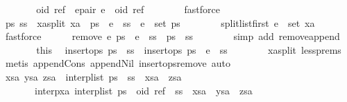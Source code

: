 \begin{isabellebody}
\ \ \ \ \isamarkupfalse%
\ \isamarkupfalse%
\ oid\ ref\ \ e{\isacharunderscore}pair{\isacharcolon}\ {\isachardoublequoteopen}e\ {\isacharequal}\ {\isacharparenleft}oid{\isacharcomma}\ ref{\isacharparenright}{\isachardoublequoteclose}\isanewline
\ \ \ \ \ \ \isamarkupfalse%
\ fastforce\isanewline
\ \ \ \ \isamarkupfalse%
\ \isamarkupfalse%
\ ps\ ss\ \ xa{\isacharunderscore}split{\isacharcolon}\ {\isachardoublequoteopen}xa\ {\isacharequal}\ ps\ {\isacharat}\ {\isacharbrackleft}e{\isacharbrackright}\ {\isacharat}\ ss{\isachardoublequoteclose}\ \ {\isachardoublequoteopen}e\ {\isasymnotin}\ set\ ps{\isachardoublequoteclose}\isanewline
\ \ \ \ \ \ \isamarkupfalse%
\ split{\isacharunderscore}list{\isacharunderscore}first\ {\isacartoucheopen}e\ {\isasymin}\ set\ xa{\isacartoucheclose}\ \isamarkupfalse%
\ fastforce\isanewline
\ \ \ \ \isamarkupfalse%
\ {\isachardoublequoteopen}remove{}\ e\ {\isacharparenleft}ps\ {\isacharat}\ e\ {\isacharhash}\ ss{\isacharparenright}\ {\isacharequal}\ ps\ {\isacharat}\ ss{\isachardoublequoteclose}\isanewline
\ \ \ \ \ \ \isamarkupfalse%
\ {\isacharparenleft}simp\ add{\isacharcolon}\ remove{}{\isacharunderscore}append{\isacharparenright}\isanewline
\ \ \ \ \isamarkupfalse%
\ \isamarkupfalse%
\ this\ \isamarkupfalse%
\ {\isachardoublequoteopen}insert{\isacharunderscore}ops\ {\isacharparenleft}ps\ {\isacharat}\ ss{\isacharparenright}{\isachardoublequoteclose}\ \ {\isachardoublequoteopen}insert{\isacharunderscore}ops\ {\isacharparenleft}ps\ {\isacharat}\ e\ {\isacharhash}\ ss{\isacharparenright}{\isachardoublequoteclose}\isanewline
\ \ \ \ \ \ \isamarkupfalse%
\ xa{\isacharunderscore}split\ less{\isachardot}prems{\isacharparenleft}{}{\isacharparenright}\ \isamarkupfalse%
\ {\isacharparenleft}metis\ append{\isacharunderscore}Cons\ append{\isacharunderscore}Nil\ insert{\isacharunderscore}ops{\isacharunderscore}remove{}{\isacharcomma}\ auto{\isacharparenright}\isanewline
\ \ \ \ \isamarkupfalse%
\ \isamarkupfalse%
\ xsa\ ysa\ zsa\ \ {\isachardoublequoteopen}interp{\isacharunderscore}list\ {\isacharparenleft}ps\ {\isacharat}\ ss{\isacharparenright}\ {\isacharequal}\ xsa\ {\isacharat}\ zsa{\isachardoublequoteclose}\isanewline
\ \ \ \ \ \ \ interp{\isacharunderscore}xa{\isacharcolon}\ {\isachardoublequoteopen}interp{\isacharunderscore}list\ {\isacharparenleft}ps\ {\isacharat}\ {\isacharparenleft}oid{\isacharcomma}\ ref{\isacharparenright}\ {\isacharhash}\ ss{\isacharparenright}\ {\isacharequal}\ xsa\ {\isacharat}\ ysa\ {\isacharat}\ zsa{\isachardoublequoteclose}\isanewline

\end{isabellebody}
